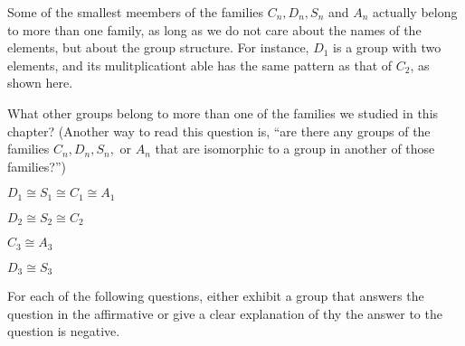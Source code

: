 \documentclass[11pt]{exam}
\begin{document}
\begin{questions}

	\question Some of the smallest meembers of the families $C_n,D_n, S_n$ and $A_n$ actually belong to more than one family, as long as we do not care about the names of the elements, but about the group structure. For instance, $D_1$ is a group with two elements, and its mulitplicationt able has the same pattern as that of $C_2$, as shown here.
	\par What other groups belong to more than one of the families we studied in this chapter? (Another way to read this question is, ``are there any groups of the families $C_n, D_n, S_n,$ or $A_n$ that are isomorphic to a group in another of those families?'')
	
	\begin{solution}
		\par $D_1\cong S_1\cong C_1 \cong A_1$
		\par $D_2\cong S_2 \cong C_2$
		\par $C_3\cong A_3$
		\par $D_3\cong S_3$
	\end{solution}

	\question For each of the following questions, either exhibit a group that answers the question in the affirmative or give a clear explanation of thy the answer to the question is negative.
\end{questions}
\end{document}
